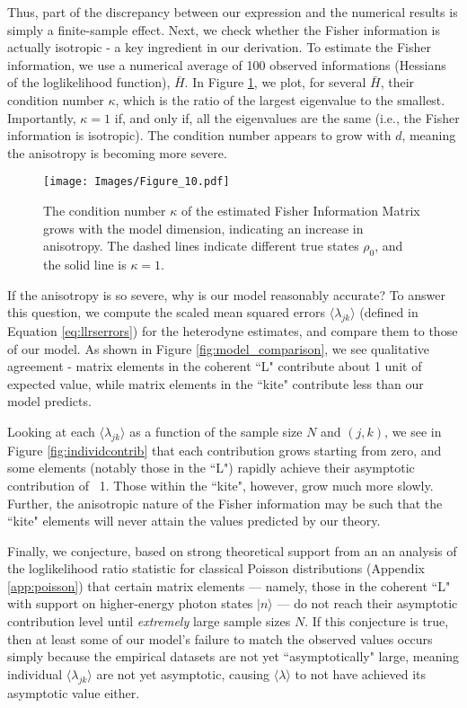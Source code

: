 \documentclass[aps,pra, twocolumn]{revtex4}
\begin{document}
Thus, part of the discrepancy between our expression and the numerical results is simply a finite-sample effect. Next, we check 
whether the Fisher information is actually isotropic - a key ingredient in our derivation. To estimate the Fisher information, we use a numerical average of 100 observed informations (Hessians of the loglikelihood function), $\bar{H}$. In  Figure \ref{fig:fish_condition}, we plot, for several $\bar{H}$, their condition number $\kappa$, which is the ratio of the largest eigenvalue to the smallest. Importantly, $\kappa = 1$ if, and only if, all the eigenvalues are the same (i.e., the Fisher information is isotropic). The condition number appears to grow with $d$, meaning the anisotropy is becoming more severe.

\begin{figure}[h]
  \texttt{[image: Images/Figure\_10.pdf]}
 \caption{The condition number $\kappa$ of the estimated Fisher Information Matrix grows with the model dimension, indicating an increase in anisotropy. The dashed lines indicate different true states $\rho_{0}$, and the solid line is $\kappa = 1$.}
\label{fig:fish_condition}
\end{figure}

If the anisotropy is so severe, why is our model reasonably accurate? To answer this question, we compute the scaled mean squared errors $\langle \lambda_{jk}\rangle$ (defined in Equation \eqref{eq:llrserrors}) for the heterodyne estimates, and compare them to those of our model. As shown in Figure \ref{fig:model_comparison}, we see qualitative agreement - matrix elements in the coherent ``L" contribute about 1 unit of 
expected value, while matrix elements in the ``kite" contribute less than our model predicts.

Looking at each $\langle \lambda_{jk} \rangle$ as a function of the sample size $N$ and $(j, k)$, we see in Figure \ref{fig:individcontrib} that each contribution grows 
starting from zero, and some elements (notably those in the ``L") rapidly achieve their asymptotic 
contribution of ~1.  Those within the ``kite", however, grow much more slowly. Further, the anisotropic nature of the Fisher information may be such that the ``kite" elements will never attain the values predicted by our theory.

Finally, we conjecture, based on strong theoretical support from an an analysis  of the loglikelihood ratio statistic for classical Poisson distributions (Appendix \ref{app:poisson}) that certain matrix elements --- namely, those in the coherent ``L" with support on higher-energy photon states $|n\rangle$ --- do not reach their asymptotic contribution level until  \emph{extremely} large 
sample sizes $N$.  If this conjecture is true, then at least some of our model's failure to match the observed values occurs 
simply because the empirical datasets are not yet ``asymptotically" large, meaning individual $\langle \lambda_{jk}\rangle$ are not yet asymptotic, causing $\langle \lambda \rangle $ to not have achieved its asymptotic value either.
\end{document}
